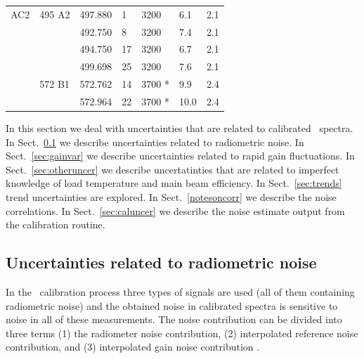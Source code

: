 \begin{table}
\begin{tabular}{|l|l|l|l|l|l|l|}
  \hline
  AC2           & 495 A2               & 497.880                   & 1            & 3200                  & 6.1 & 2.1\\
  \cline{3-3}
  \cline{4-4}
  \cline{5-5}
  \cline{6-6}
  \cline{7-7}
                &                      & 492.750                   & 8            & 3200                  & 7.4 & 2.1\\
  \cline{3-3}
  \cline{4-4}
  \cline{5-5}
  \cline{6-6}
  \cline{7-7}
                &                      & 494.750                   & 17           & 3200                  & 6.7 & 2.1\\
  \cline{3-3}
  \cline{4-4}
  \cline{5-5}
  \cline{6-6}
  \cline{7-7}
                &                      & 499.698                   & 25           & 3200                 & 7.6 & 2.1\\
  \cline{2-2}
  \cline{3-3}
  \cline{4-4}
  \cline{5-5}
  \cline{6-6}
  \cline{7-7}
                & 572 B1              & 572.762                    & 14           & 3700 *              & 9.9 & 2.4\\
  \cline{3-3}
  \cline{4-4}
  \cline{5-5}
  \cline{6-6}
  \cline{7-7}
                &                     & 572.964                    & 22           & 3700 *              & 10.0 & 2.4\\
  \hline
\end{tabular}
\end{table}

In this section we deal with uncertainties that are related to calibrated \smr\ spectra. 
In Sect.~\ref{sec:radnoise} we describe uncertainties related to radiometric noise.
In Sect.~\ref{sec:gainvar} we describe uncertainties related to rapid gain fluctuations.
In Sect.~\ref{sec:otheruncer} we describe uncertatinties that are related to imperfect knowledge
of load temperature and main beam efficiency.
In Sect.~\ref{sec:trends} trend uncertainties are explored.
In Sect.~\ref{notesoncorr} we describe the noise correlations. 
In Sect.~\ref{sec:caluncer} we describe the noise estimate output from the calibration routine.  


\subsection{Uncertainties related to radiometric noise}
\label{sec:radnoise}

In the \smr\ calibration process three types of signals are used (all of them containing radiometric noise)
and the obtained noise in calibrated spectra is sensitive to noise in
all of these measurements. 
The noise contribution can be divided into three terms
(1) the radiometer noise contribution,
(2) interpolated reference noise contribution, and (3) interpolated gain noise contribution
\cite{jarnot:04}.

